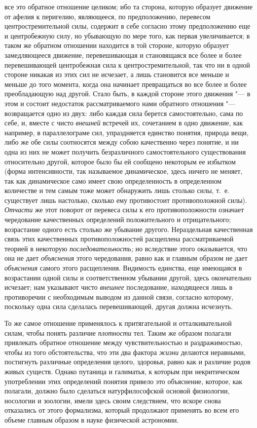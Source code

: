 все это обратное отношение целиком; ибо та сторона, которую образует
движение от афелия к перигелию, являющееся, по предположению, перевесом
центростремительной силы, содержит в себе согласно этому предположению еще
и центробежную силу, но убывающую по мере того, как первая увеличивается; в
таком же обратном отношении находится в той стороне, которую образует
замедляющееся движение, перевешивающая и становящаяся все более и более
перевешивающей центробежная сила к центростремительной, так что ни в одной
стороне никакая из этих сил не исчезает, а лишь становится все меньше и
меньше до того момента, когда она начинает превращаться во все более и
более преобладающую над другой. Стало быть, в каждой стороне этого движения
"--- в этом и состоит недостаток рассматриваемого нами обратного отношения
"--- возвращается одно из двух: либо каждая сила берется самостоятельно, сама
по себе, и, вместе с чисто {\em внешней} встречей их,
сочетанием в одно движение, как например, в параллелограме сил,
упраздняется единство понятия, природа вещи, либо же обе силы соотносятся
между собою качественно через понятие, и ни одна из них не может получить
безразличного самостоятельного существования относительно другой, которое
было бы ей сообщено некоторым ее избытком (форма интенсивности, так
называемое динамическое, здесь ничего не меняет, так как динамическое само
имеет свою определенность в определенном количестве и тем самым тоже может
обнаружить лишь столько силы, т.~е. существует лишь настолько, сколько ему
противостоит противоположной силы). {\em Отчасти} же
этот поворот от перевеса силы к его противоположности означает чередование
качественных определений положительного и отрицательного; возрастание
одного есть столько же убывание другого. Нераздельная качественная связь
этих качественных противоположностей расщеплена рассматриваемой теорией в
некоторую {\em последовательность;} но вследствие этого
оказывается, что она не дает {\em объяснения} этого
чередования, равно как и главным образом не дает
{\em объяснения} самого этого расщепления. Видимость
единства, еще имеющаяся в возрастании одной силы и соответственном убывании
другой, здесь окончательно исчезает; нам указывают чисто
{\em внешнее} последование, находящееся лишь в
противоречии с необходимым выводом из данной связи, согласно которому,
поскольку одна сила сделалась перевешивающей, другая должна исчезнуть.

То же самое отношение применялось к притягательной и отталкивательной силам,
чтобы понять различие {\em плотности} тел. Таким же
образом полагали привлекать обратное отношение между чувствительностью и
раздражимостью, чтобы из того обстоятельства, что эти два фактора
{\em жизни} делаются неравными, постигнуть различные
определения целого, здоровья, равно как и различие родов живых существ.
Однако путаница и галиматья, к которым при некритическом употреблении этих
определений понятия привело это объяснение, которое, как полагали, должно
было сделаться натурфилософской основой физиологии, носологии и зоологии,
имели здесь своим следствием, что вскоре снова отказались от этого
формализма, который продолжают применять во всем его объеме главным образом
в науке физической астрономии.

